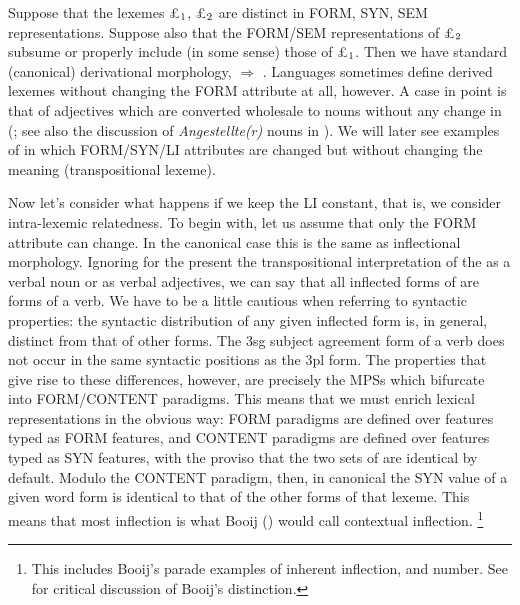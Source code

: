 \documentclass[output=paper,
modfonts
]{LSP/langsci}
\begin{document}
Suppose that the lexemes \pounds$\sb{1}$, \pounds$\sb{2}$ are distinct in FORM, SYN, SEM representations. Suppose also that the FORM/SEM representations of \pounds$\sb{2}$ subsume or properly include (in some sense) those of \pounds$\sb{1}$. Then we have standard (canonical) derivational morphology,  $\Rightarrow$ . %
Languages sometimes define derived lexemes without changing the FORM attribute at all, however. %
A case in point is that of adjectives which are converted wholesale to nouns without any change in  (\citealt{Spencer02:gender};
see also the discussion of \textit{Angestellte(r)} nouns in \citealt{Spencer13:book}). We will later see examples of  in which FORM/SYN/LI attributes are changed but without changing the meaning (transpositional lexeme). 

Now let’s consider what happens if we keep the LI constant, that is, we consider intra-lexemic relatedness. To begin with, let us assume that only the FORM attribute can change. In the canonical case this is the same as inflectional morphology.  Ignoring for the present the transpositional interpretation of the  as a verbal noun or as verbal adjectives, we can  say that all inflected forms of  are forms of a verb. We have to be a little cautious when referring to syntactic properties: the syntactic distribution of any given inflected form is, in general, distinct from that of other forms. The 3sg subject agreement form of a verb does not occur in the same syntactic positions as the 3pl form. The properties that give rise to these differences, however, are precisely the MPSs which bifurcate into FORM/CONTENT paradigms. This means that we must enrich lexical representations in the obvious way: FORM paradigms are defined over features typed as FORM features, and CONTENT paradigms are defined over features typed as SYN features, with the proviso that the two sets of  are identical by default. Modulo the CONTENT paradigm, then, in canonical  the SYN value of a given word form is identical to that of the other forms of that lexeme. This means that most inflection is what Booij (\citeyear*{Booij94}) would call contextual inflection.%
\footnote{This includes Booij’s parade examples of inherent inflection,  and  number. See \citet[77--82]{Spencer13:book} for critical discussion of Booij’s distinction.} %
\end{document}
